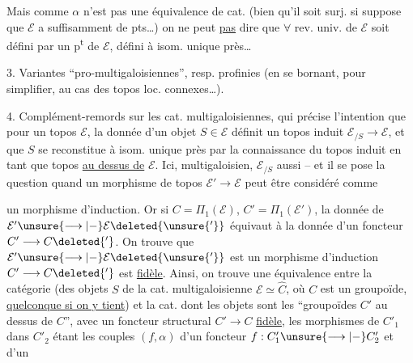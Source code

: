 Mais comme $\alpha$ n'est pas une équivalence de cat. (bien qu'il soit   surj. si  suppose que $\mathcal E$ a suffisamment de pts\dots) on ne peut \uline{pas} dire que $\forall$ rev. univ. de $\mathcal E$ soit défini par un p\textsuperscript{t} de $\mathcal E$, défini à isom. unique près\dots



3. Variantes ``pro-multigaloisiennes'', resp. profinies (en se bornant, pour simplifier, au cas des topos loc. connexes\dots).

4. Complément-remords sur les cat. multigaloisiennes, qui précise l'intention que pour un topos $\mathcal E$, la donnée d'un objet $S\in\mathcal E$ définit un topos induit $\mathcal E_{/S}\longrightarrow\mathcal E$, et que $S$ se reconstitue à isom. unique près par la connaissance du topos induit en tant que topos \uline{au dessus de} $\mathcal E$. Ici,   multigaloisien, $\mathcal E_{/S}$ aussi -- et il se pose la question quand un morphisme de topos  $\mathcal E'\longrightarrow\mathcal E$ peut être considéré comme



un morphisme d'induction. Or si $C=\Pi_1(\mathcal E)$, $C'=\Pi_1(\mathcal E')$, la donnée de $\mathcal E'\unsure{\longrightarrow|-}\mathcal E\deleted{\unsure{'}}$ équivaut à la donnée d'un foncteur $C'\longrightarrow C\deleted{'}$. On trouve que $\mathcal E'\unsure{\longrightarrow|-}\mathcal E\deleted{\unsure{'}}$ est un morphisme d'induction  $C'\longrightarrow C\deleted{'}$ est \uline{fidèle}. Ainsi, on trouve une équivalence entre la catégorie  (des objets $S$ de la cat. multigaloisienne $\mathcal E\simeq\widehat C$,  où $C$ est un groupoïde, \uline{quelconque si on y tient})
et la cat. dont les objets sont les ``groupoïdes $C'$ au dessus de $C$'', avec un foncteur structural $C'\longrightarrow C$ \uline{fidèle}, les morphismes de $C'_1$ dans $C'_2$ étant les   couples $(f,\alpha)$ d'un foncteur $f:C'_1\unsure{\longrightarrow|-}C'_2$ et d'un



